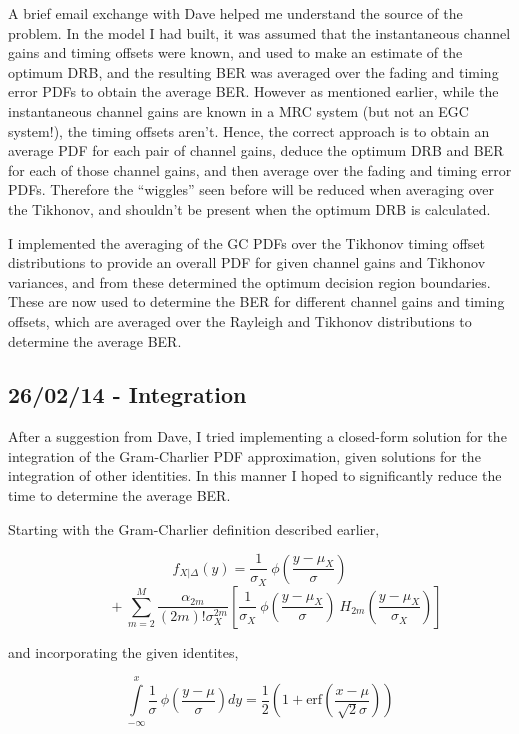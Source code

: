 A brief email exchange with Dave helped me understand the source of the
problem. In the model I had built, it was assumed that the instantaneous
channel gains and timing offsets were known, and used to make an
estimate of the optimum DRB, and the resulting BER was averaged over the
fading and timing error PDFs to obtain the average BER. However as
mentioned earlier, while the instantaneous channel gains are known in a
MRC system (but not an EGC system!), the timing offsets aren't. Hence,
the correct approach is to obtain an average PDF for each pair of
channel gains, deduce the optimum DRB and BER for each of those channel
gains, and then average over the fading and timing error PDFs. Therefore
the ``wiggles'' seen before will be reduced when averaging over the
Tikhonov, and shouldn't be present when the optimum DRB is calculated.

I implemented the averaging of the GC PDFs over the Tikhonov timing
offset distributions to provide an overall PDF for given channel gains
and Tikhonov variances, and from these determined the optimum decision
region boundaries. These are now used to determine the BER for different
channel gains and timing offsets, which are averaged over the Rayleigh
and Tikhonov distributions to determine the average BER.

\subsection{26/02/14 - Integration}

After a suggestion from Dave, I tried implementing a closed-form
solution for the integration of the Gram-Charlier PDF approximation,
given solutions for the integration of other identities. In this manner
I hoped to significantly reduce the time to determine the average BER.

Starting with the Gram-Charlier definition described earlier,

\[
f_{X\vert \Delta}(y) = \frac{1}{\sigma_X} \: \phi \! \left ( \frac{y-\mu_X}{\sigma} \right )
\]
\[
\; \; \; \; \; \; \; \; + \sum \limits_{m=2}^M \frac{\alpha_{2m}}{(2m)! \sigma_X^{2m}} \left [ \frac{1}{\sigma_X} \: \phi \! \left ( \frac{y-\mu_X}{\sigma} \right ) \: H_{2m} \! \left ( \frac{y-\mu_X}{\sigma_X} \right ) \right ]
\]

and incorporating the given identites,

\[
\int \limits_{-\infty}^x \frac{1}{\sigma} \: \phi \! \left ( \frac{y-\mu}{\sigma} \right ) dy =
\frac{1}{2} \left ( 1 + \text{erf} \! \left ( \frac{x-\mu}{\sqrt{2} \sigma} \right ) \right )
\]

